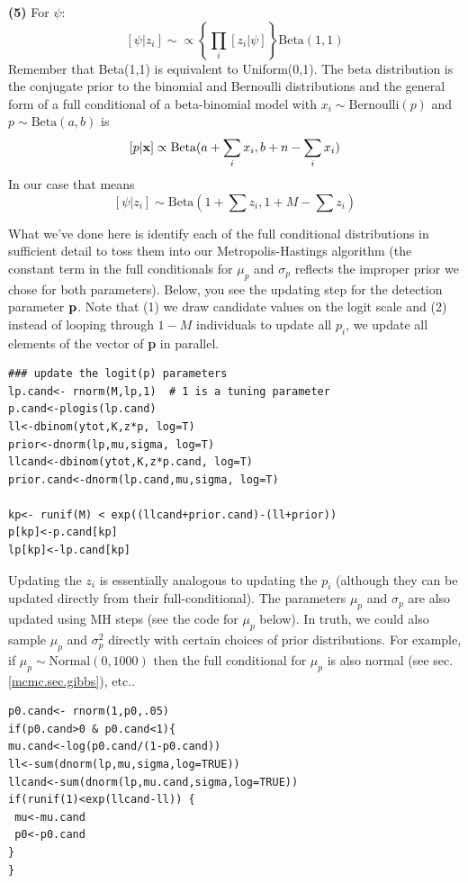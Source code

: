 {\bf (5)} For $\psi$:
\[
[\psi|z_{i}] \sim \propto \left\{ \prod_{i} [z_{i}|\psi] \right\} \mbox{Beta}(1,1)
\]
Remember that \mbox{Beta}(1,1) is equivalent to \mbox{Uniform}(0,1). The beta distribution is the conjugate prior to the binomial and 
Bernoulli distributions and the general form of a full conditional of a beta-binomial model 
with $x_{i} \sim \mbox{Bernoulli} (p) $ and $p \sim \mbox{Beta}(a,b)$ is
\[
[p|{\bf x}] \propto \mbox{Beta}(a + \sum_i x_i, b + n-\sum_i x_i)
\]
In our case that means
\[
[\psi|z_{i}] \sim \mbox{Beta}(1 + \sum z_{i}, 1 + M - \sum z_{i})
\]

What we've done here is identify each of the full conditional
distributions in sufficient detail to toss them into our
Metropolis-Hastings algorithm (the constant term in the full
conditionals for $\mu_{p}$ and $\sigma_{p}$ reflects the improper
prior we chose for both parameters).  Below, you see the updating step
for the detection parameter ${\bf p}$. Note that (1) we draw candidate
values on the logit scale and (2) instead of looping through $1 - M$
individuals to update all $p_{i}$, we update all elements of the
vector of {\bf p} in parallel.

\begin{verbatim}
### update the logit(p) parameters
lp.cand<- rnorm(M,lp,1)  # 1 is a tuning parameter
p.cand<-plogis(lp.cand)
ll<-dbinom(ytot,K,z*p, log=T)
prior<-dnorm(lp,mu,sigma, log=T)
llcand<-dbinom(ytot,K,z*p.cand, log=T)
prior.cand<-dnorm(lp.cand,mu,sigma, log=T)

kp<- runif(M) < exp((llcand+prior.cand)-(ll+prior))
p[kp]<-p.cand[kp]
lp[kp]<-lp.cand[kp]
\end{verbatim}

Updating the $z_{i}$ is essentially analogous to updating the $p_{i}$
(although they can be updated directly from their
full-conditional). The parameters $\mu_{p}$ and $\sigma_{p}$ are also updated using MH steps (see the code for $\mu_{p}$ below). In truth, we could also sample $\mu_{p}$
and $\sigma_{p}^{2}$ directly with certain choices of prior
distributions. For example, if $\mu_{p} \sim \mbox{Normal}(0, 1000)$
then the full conditional for $\mu_{p}$ is also normal (see
sec. \ref{mcmc.sec.gibbs}), etc..

\begin{verbatim}
p0.cand<- rnorm(1,p0,.05)
if(p0.cand>0 & p0.cand<1){
mu.cand<-log(p0.cand/(1-p0.cand))
ll<-sum(dnorm(lp,mu,sigma,log=TRUE))
llcand<-sum(dnorm(lp,mu.cand,sigma,log=TRUE))
if(runif(1)<exp(llcand-ll)) {
 mu<-mu.cand
 p0<-p0.cand
}
}
\end{verbatim}

